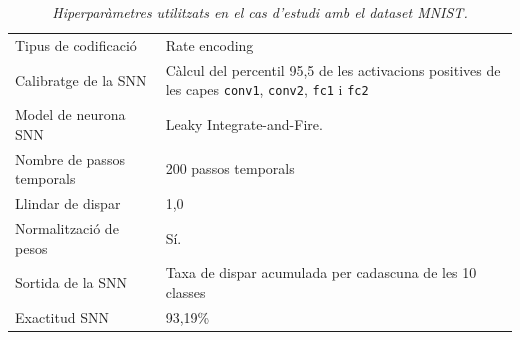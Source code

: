 \documentclass[a4paper,11pt, titlepage, twoside]{article}
\begin{document}
\begin{appendices}
\begin{table}[H]
\begin{tabular}{p{4.2cm} p{8.5cm}}
			Tipus de codificació
			                   & Rate encoding                                                                                                                                      \\

			Calibratge de la SNN
			                   & Càlcul del percentil 95,5 de les activacions positives de les capes \texttt{conv1}, \texttt{conv2}, \texttt{fc1} i \texttt{fc2}                    \\

			Model de neurona SNN
			                   & Leaky Integrate-and-Fire.                                                                                                                          \\

			Nombre de passos temporals
			                   & 200 passos temporals                                                                                                                               \\

			Llindar de dispar
			                   & 1,0                                                                                                                                                \\


			Normalització de pesos
			                   & Sí.                                                                                                                                                \\

			Sortida de la SNN
			                   & Taxa de dispar acumulada per cadascuna de les 10 classes                                                                                           \\

			Exactitud SNN
			                   & 93,19\%                                                                                                                                            \\

			\hline
		\end{tabular}

		\caption*{\textit{Hiperparàmetres utilitzats en el cas d'estudi amb el dataset MNIST.}}
		\label{tab:hiperparametres_mnist}
	\end{table}
	\vspace{5mm}

\end{appendices}
\end{document}
